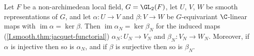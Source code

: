 Let $F$ be a non-archimedean local field, $G=\GL_2(F)$, let $U$, $V$, $W$ be smooth representations of $G$, and let
$\alpha\colon U\to V$ and $\beta\colon V\to W$ be $G$-equivariant $\C$-linear maps with $\operatorname{im}\alpha=\ker\beta$.
Then $\operatorname{im}\alpha_N=\ker\beta_N$ for the induced maps (\cref{I.smooth.thm:jacquet-functorial}) $\alpha_N\colon U_N\to V_N$ and
$\beta_N\colon V_N\to W_N$. Moreover, if $\alpha$ is injective then so is $\alpha_N$, and if $\beta$ is surjective then so
is $\beta_N$.
